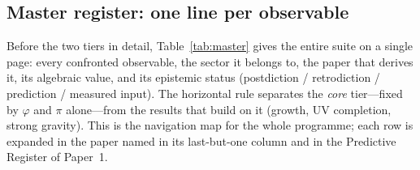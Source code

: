 \documentclass[a4paper,11pt]{article}
\begin{document}
\subsection{Master register: one line per observable}
\label{sec:master-register}

Before the two tiers in detail, Table~\ref{tab:master} gives the entire suite
on a single page: every confronted observable, the sector it belongs to, the
paper that derives it, its algebraic value, and its epistemic status
(postdiction / retrodiction / prediction / measured input). The horizontal rule
separates the \emph{core} tier---fixed by $\varphi$ and $\pi$ alone---from the results that build on it (growth, UV completion, strong gravity). This is the navigation map for the whole programme; each row is expanded
in the paper named in its last-but-one column and in the Predictive Register of
Paper~1.
\end{document}
